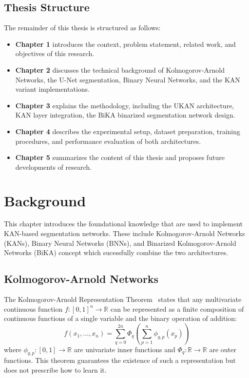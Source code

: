 \documentclass[a4paper]{report}
\begin{document}
\section{Thesis Structure}
\label{sec: structure}
The remainder of this thesis is structured as follows:
\begin{itemize}
    \item \textbf{Chapter 1} introduces the context, problem statement, related work, and objectives of this research.
    \item \textbf{Chapter 2} discusses the technical background of Kolmogorov-Arnold Networks, the U-Net segmentation, Binary Neural Networks, and the KAN variant implementations.
    \item \textbf{Chapter 3} explains the methodology, including the UKAN architecture, KAN layer integration, the BiKA binarized segmentation network design.
    \item \textbf{Chapter 4} describes the experimental setup, dataset preparation, training procedures, and performance evaluation of both architectures.
    \item \textbf{Chapter 5} summarizes the content of this thesis and proposes future developments of research.

\end{itemize}



\chapter{Background}
\label{ch:background}

This chapter introduces the foundational knowledge that are used to implement KAN-based segmentation networks. These include Kolmogorov-Arnold Networks (KANs), Binary Neural Networks (BNNs), and Binarized Kolmogorov-Arnold Networks (BiKA) concept which sucessfully combine the two architectures. 

\section{Kolmogorov-Arnold Networks}
\label{sec:kan_background}

The Kolmogorov-Arnold Representation Theorem~\cite{kolmogorov1957, arnold2009} states that any multivariate continuous function $f: [0,1]^n \rightarrow \mathbb{R}$ can be represented as a finite composition of continuous functions of a single variable and the binary operation of addition:
\begin{equation}
    f(x_1, \dots, x_n) = \sum_{q=0}^{2n} \Phi_q \left( \sum_{p=1}^{n} \phi_{q,p}(x_p) \right)
\end{equation}
where $\phi_{q,p}: [0,1] \rightarrow \mathbb{R}$ are univariate inner functions and $\Phi_q: \mathbb{R} \rightarrow \mathbb{R}$ are outer functions. This theorem guarantees the existence of such a representation but does not prescribe how to learn it.
\end{document}
